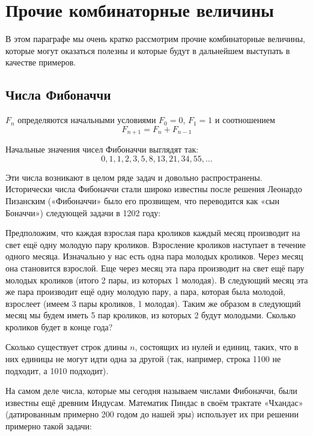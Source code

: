 \section{Прочие комбинаторные величины}

В этом параграфе мы очень кратко рассмотрим прочие комбинаторные величины, которые могут оказаться полезны и которые будут в дальнейшем выступать в качестве примеров.

\subsection{Числа Фибоначчи}

\begin{definition}
 $F_n$ определяются начальными условиями $F_0 = 0$, $F_1 = 1$ и соотношением
$$F_{n+1} = F_n + F_{n-1}$$
\end{definition}

Начальные значения чисел Фибоначчи выглядят так:
$$0, 1, 1, 2, 3, 5, 8, 13, 21, 34, 55, \ldots$$

Эти числа возникают в целом ряде задач и довольно распространены. Исторически числа Фибоначчи стали широко известны после решения Леонардо Пизанским («Фибоначчи»  было его прозвищем, что переводится как «сын Боначчи») следующей задачи в 1202 году:

\begin{exercise}
Предположим, что каждая взрослая пара кроликов каждый месяц производит на свет ещё одну молодую пару кроликов. Взросление кроликов наступает в течение одного месяца. Изначально у нас есть одна пара молодых кроликов. Через месяц она становится взрослой. Еще через месяц эта пара производит на свет ещё пару молодых кроликов (итого 2 пары, из которых 1 молодая). В следующий месяц эта же пара производит ещё одну молодую пару, а пара, которая была молодой, взрослеет (имеем 3 пары кроликов, 1 молодая). Таким же образом в следующий месяц мы будем иметь 5 пар кроликов, из которых 2 будут молодыми. Сколько кроликов будет в конце года?
\end{exercise}

\begin{exercise}
Сколько существует строк длины $n$, состоящих из нулей и единиц, таких, что в них единицы не могут идти одна за другой (так, например, строка 1100 не подходит, а 1010 подходит).
\end{exercise}

На самом деле числа, которые мы сегодня называем числами Фибоначчи, были известны ещё древним Индусам. Математик Пиндас в своём трактате «Чхандас» (датированным примерно 200 годом до нашей эры) использует их при решении примерно такой задачи:

